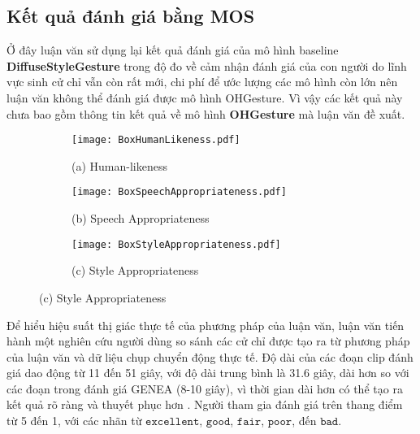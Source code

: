 \subsection{Kết quả đánh giá bằng MOS}

Ở đây luận văn sử dụng lại kết quả đánh giá của mô hình baseline \textbf{DiffuseStyleGesture} \cite{yang2023diffusestylegesture} trong độ đo về  cảm nhận đánh giá của con người do lĩnh vực sinh cử chỉ vẫn còn rất mới, chi phí để ước lượng các mô hình còn lớn nên luận văn không thể đánh giá được mô hình OHGesture. Vì vậy các kết quả này chưa bao gồm thông tin kết quả về mô hình \textbf{OHGesture} mà luận văn đề xuất.

\begin{figure}[htbp]
	\centering
	\begin{subfigure}[b]{0.3\textwidth}
		\texttt{[image: BoxHumanLikeness.pdf]}
		\caption*{(a) Human-likeness}
	\end{subfigure}
	\hfill
	\begin{subfigure}[b]{0.3\textwidth}
		\texttt{[image: BoxSpeechAppropriateness.pdf]}
		\caption*{\small (b) Speech Appropriateness}
	\end{subfigure}
	\hfill
	\begin{subfigure}[b]{0.3\textwidth}
		\texttt{[image: BoxStyleAppropriateness.pdf]}
		\caption*{(c) Style Appropriateness}
	\end{subfigure}
	
	\label{fig:compare }
\end{figure}


Để hiểu hiệu suất thị giác thực tế của phương pháp của luận văn, luận văn tiến hành một nghiên cứu người dùng so sánh các cử chỉ được tạo ra từ phương pháp của luận văn và dữ liệu chụp chuyển động thực tế. Độ dài của các đoạn clip đánh giá dao động từ 11 đến 51 giây, với độ dài trung bình là 31.6 giây, dài hơn so với các đoạn trong đánh giá GENEA \cite{yoon2022genea} (8-10 giây), vì thời gian dài hơn có thể tạo ra kết quả rõ ràng và thuyết phục hơn \cite{yang2022reprgesture}. Người tham gia đánh giá trên thang điểm từ 5 đến 1, với các nhãn từ $\texttt{excellent}$,  $\texttt{good}$, $\texttt{fair}$, $\texttt{poor}$, đến $\texttt{bad}$. 

